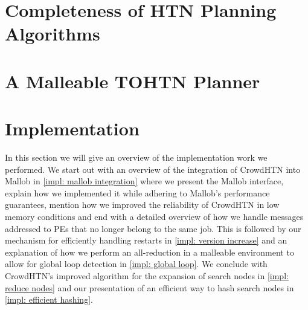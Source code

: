 \documentclass[enabledeprecatedfontcommands,12pt,a4paper,twoside]{scrartcl}
\numberwithin{equation}{section}
\begin{document}
\pagebreak
\section{Completeness of HTN Planning Algorithms}
\label{improv: completeness}

\clearpage
\pagebreak
\section{A Malleable TOHTN Planner}
\label{malleable: overview}


\pagebreak
\section{Implementation}
\label{impl}
In this section we will give an overview of the implementation work we performed. We start out with an overview of the integration of CrowdHTN into Mallob in \ref{impl: mallob integration} where we present the Mallob interface, explain how we implemented it while adhering to Mallob's performance guarantees, mention how we improved the reliability of CrowdHTN in low memory conditions and end with a detailed overview of how we handle messages addressed to PEs that no longer belong to the same job. This is followed by our mechanism for efficiently handling restarts in \ref{impl: version increase} and an explanation of how we perform an all-reduction in a malleable environment to allow for global loop detection in \ref{impl: global loop}. We conclude with CrowdHTN's improved algorithm for the expansion of search nodes in \ref{impl: reduce nodes} and our presentation of an efficient way to hash search nodes in \ref{impl: efficient hashing}.


\clearpage
\pagebreak
\end{document}
